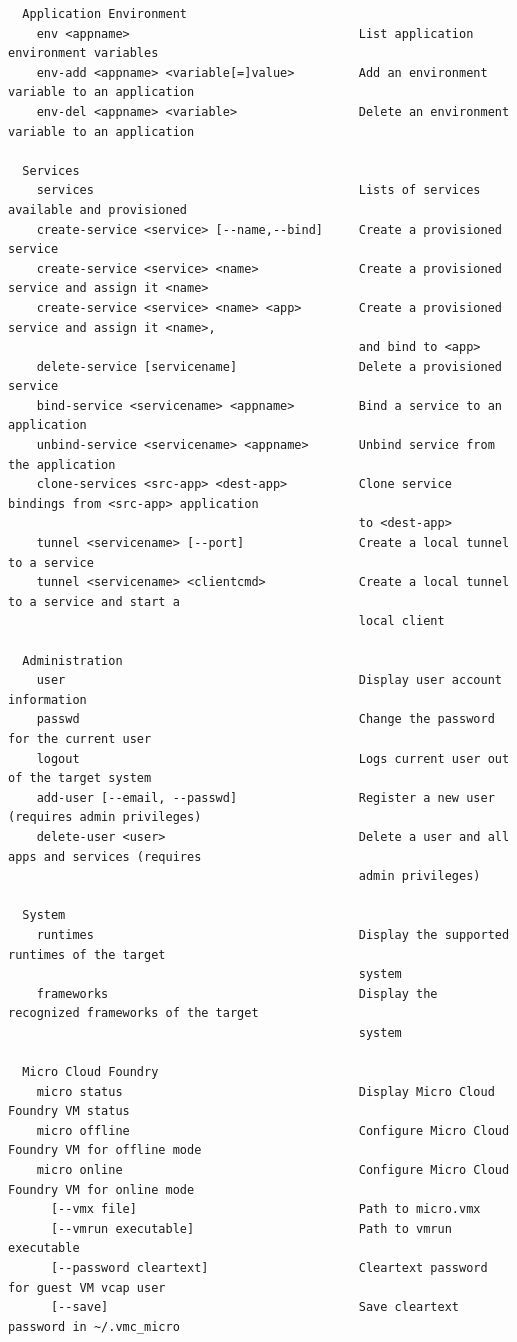 \begin{lstlisting}
  Application Environment 
    env <appname>                                List application environment variables 
    env-add <appname> <variable[=]value>         Add an environment variable to an application 
    env-del <appname> <variable>                 Delete an environment variable to an application 

  Services 
    services                                     Lists of services available and provisioned 
    create-service <service> [--name,--bind]     Create a provisioned service 
    create-service <service> <name>              Create a provisioned service and assign it <name> 
    create-service <service> <name> <app>        Create a provisioned service and assign it <name>, 
                                                 and bind to <app> 
    delete-service [servicename]                 Delete a provisioned service 
    bind-service <servicename> <appname>         Bind a service to an application 
    unbind-service <servicename> <appname>       Unbind service from the application 
    clone-services <src-app> <dest-app>          Clone service bindings from <src-app> application 
                                                 to <dest-app> 
    tunnel <servicename> [--port]                Create a local tunnel to a service 
    tunnel <servicename> <clientcmd>             Create a local tunnel to a service and start a 
                                                 local client 

  Administration 
    user                                         Display user account information 
    passwd                                       Change the password for the current user 
    logout                                       Logs current user out of the target system 
    add-user [--email, --passwd]                 Register a new user (requires admin privileges) 
    delete-user <user>                           Delete a user and all apps and services (requires 
                                                 admin privileges) 

  System 
    runtimes                                     Display the supported runtimes of the target 
                                                 system 
    frameworks                                   Display the recognized frameworks of the target 
                                                 system 

  Micro Cloud Foundry 
    micro status                                 Display Micro Cloud Foundry VM status 
    micro offline                                Configure Micro Cloud Foundry VM for offline mode 
    micro online                                 Configure Micro Cloud Foundry VM for online mode 
      [--vmx file]                               Path to micro.vmx 
      [--vmrun executable]                       Path to vmrun executable 
      [--password cleartext]                     Cleartext password for guest VM vcap user 
      [--save]                                   Save cleartext password in ~/.vmc_micro 


\end{lstlisting}
